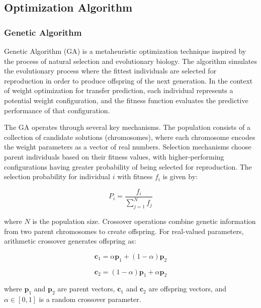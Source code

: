 \subsection{Optimization Algorithm}

\subsubsection{Genetic Algorithm}

Genetic Algorithm (GA) is a metaheuristic optimization technique inspired by the process of natural selection and evolutionary biology. The algorithm simulates the evolutionary process where the fittest individuals are selected for reproduction in order to produce offspring of the next generation. In the context of weight optimization for transfer prediction, each individual represents a potential weight configuration, and the fitness function evaluates the predictive performance of that configuration.

The GA operates through several key mechanisms. The population consists of a collection of candidate solutions (chromosomes), where each chromosome encodes the weight parameters as a vector of real numbers. Selection mechanisms choose parent individuals based on their fitness values, with higher-performing configurations having greater probability of being selected for reproduction. The selection probability for individual $i$ with fitness $f_i$ is given by:

\begin{equation}
P_i = \frac{f_i}{\sum_{j=1}^{N} f_j}
\end{equation}

where $N$ is the population size. Crossover operations combine genetic information from two parent chromosomes to create offspring. For real-valued parameters, arithmetic crossover generates offspring as:

\begin{equation}
\mathbf{c}_1 = \alpha \mathbf{p}_1 + (1-\alpha) \mathbf{p}_2
\end{equation}

\begin{equation}
\mathbf{c}_2 = (1-\alpha) \mathbf{p}_1 + \alpha \mathbf{p}_2
\end{equation}

where $\mathbf{p}_1$ and $\mathbf{p}_2$ are parent vectors, $\mathbf{c}_1$ and $\mathbf{c}_2$ are offspring vectors, and $\alpha \in [0,1]$ is a random crossover parameter.

